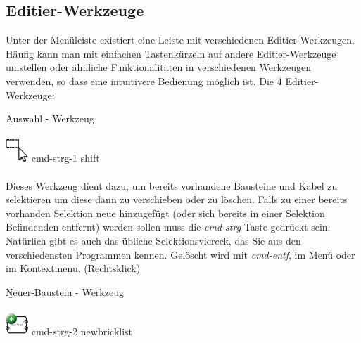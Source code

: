 \documentclass[12pt,a4paper]{scrartcl}
\newcommand{\fckNewBrickTool}{Neuer-Baustein - Werkzeug\xspace}
\newcommand{\fckSelectTool}{Auswahl - Werkzeug\xspace}
\begin{document}
\subsection{Editier-Werkzeuge}
Unter der Menüleiste existiert eine Leiste mit verschiedenen Editier-Werkzeugen. Häufig kann man mit einfachen Tastenkürzeln auf andere Editier-Werkzeuge umstellen oder ähnliche Funktionalitäten in verschiedenen Werkzeugen verwenden, so dass eine intuitivere Bedienung möglich ist. Die 4 Editier-Werkzeuge:
\begin{enum}
	\item \b{\fckSelectTool} \\ \\
		{\Large \hspace{0.5em} \includegraphics[height=2ex]{images/selecttool.png} \hspace{0.5em}\textbullet \hspace{0.5em} \gls{cmd-strg-1} \hspace{0.5em}\textbullet \hspace{0.5em} \gls{shift}} \\ \\
		Dieses Werkzeug dient dazu, um bereits vorhandene Bausteine und Kabel zu selektieren um diese dann zu verschieben oder zu löschen. Falls zu einer bereits vorhanden Selektion neue hinzugefügt (oder sich bereits in einer Selektion Befindenden entfernt) werden sollen muss die \textit{\gls{cmd-strg}} Taste gedrückt sein. Natürlich gibt es auch das übliche Selektionsviereck, das Sie aus den verschiedensten Programmen kennen. Gelöscht wird mit \textit{\gls{cmd-entf}}, im Menü oder im Kontextmenu. (Rechtsklick) \\
 	\item \b{\fckNewBrickTool} \\ \\
		{\Large \hspace{0.5em} \includegraphics[height=2ex]{images/newbricktool.png} \hspace{0.5em}\textbullet \hspace{0.5em} \gls{cmd-strg-2} \hspace{0.5em}\textbullet \hspace{0.5em} \gls{newbricklist}} \\ \\

\end{enum}
\end{document}
